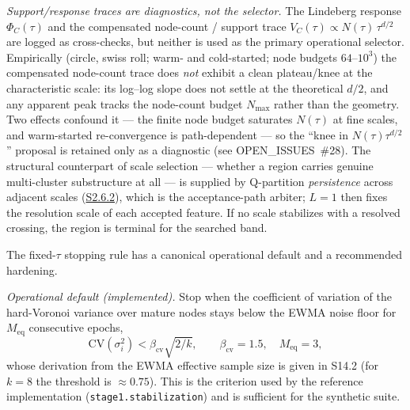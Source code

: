 \documentclass[11pt]{article}
\begin{document}
\emph{Support/response traces are diagnostics, not the selector.} The Lindeberg
response $\Phi_C(\tau)$ and the compensated node-count / support trace
$V_C(\tau)\propto N(\tau)\,\tau^{d/2}$ are logged as cross-checks, but neither is
used as the primary operational selector. Empirically (circle, swiss roll; warm-
and cold-started; node budgets $64$--$10^3$) the compensated node-count trace
does \emph{not} exhibit a clean plateau/knee at the characteristic scale: its
log--log slope does not settle at the theoretical $d/2$, and any apparent peak
tracks the node-count budget $N_{\max}$ rather than the geometry. Two effects
confound it --- the finite node budget saturates $N(\tau)$ at fine scales, and
warm-started re-convergence is path-dependent --- so the ``knee in
$N(\tau)\tau^{d/2}$'' proposal is retained only as a diagnostic (see
OPEN\_ISSUES~\#28). The structural counterpart of scale selection --- whether a
region carries genuine multi-cluster substructure at all --- is supplied by
Q-partition \emph{persistence} across adjacent scales
(\hyperref[sec:si-feature-persistence]{S2.6.2}), which is the acceptance-path arbiter;
$L=1$ then fixes the resolution scale of each accepted feature. If no scale
stabilizes with a resolved crossing, the region is terminal for the searched band.

The fixed-$\tau$ stopping rule has a canonical operational default and a
recommended hardening.

\emph{Operational default (implemented).} Stop when the coefficient of variation
of the hard-Voronoi variance over mature nodes stays below the EWMA noise floor
for $M_{\mathrm{eq}}$ consecutive epochs,
\[
\mathrm{CV}(\sigma_i^2)<\beta_{\mathrm{cv}}\sqrt{2/k},
\qquad \beta_{\mathrm{cv}}=1.5,\quad M_{\mathrm{eq}}=3,
\]
whose derivation from the EWMA effective sample size is given in S14.2 (for
$k=8$ the threshold is $\approx0.75$). This is the criterion used by the
reference implementation (\texttt{stage1.stabilization}) and is sufficient for
the synthetic suite.
\end{document}
